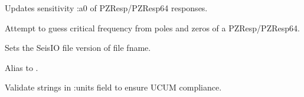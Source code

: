 \documentclass[letterpaper,11pt,english]{sphinxmanual}
\begin{document}
\begin{fulllineitems}
\end{fulllineitems}


Updates sensitivity :a0 of PZResp/PZResp64 responses.

\begin{fulllineitems}
\label{\detokenize{src/Appendices/function_list:resptofc}}
\end{fulllineitems}


Attempt to guess critical frequency from poles and zeros of a PZResp/PZResp64.

\begin{fulllineitems}
\label{\detokenize{src/Appendices/function_list:set_file_ver}}
\end{fulllineitems}


Sets the SeisIO file version of file fname.

\begin{fulllineitems}
\label{\detokenize{src/Appendices/function_list:u2d}}
\end{fulllineitems}


Alias to .

\begin{fulllineitems}
\label{\detokenize{src/Appendices/function_list:validate_units}}
\end{fulllineitems}


Validate strings in :units field to ensure UCUM compliance.

\begin{fulllineitems}
\label{\detokenize{src/Appendices/function_list:vucum}}
\end{fulllineitems}
\end{document}
